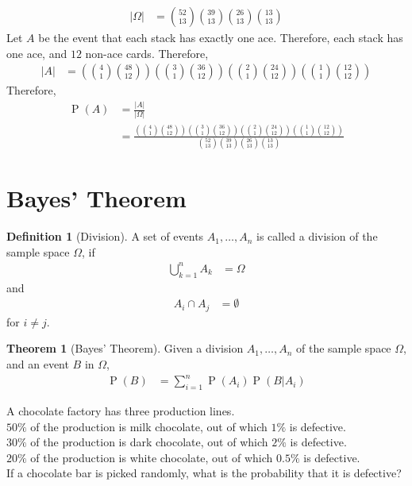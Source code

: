 \documentclass[titlepage, fleqn, a4paper, 12pt, twoside]{article}
\theoremstyle{definition}
\newtheorem{definition}{Definition}
\theoremstyle{theorem}
\newtheorem{theorem}{Theorem}
\DeclareMathOperator{\prob}{\mathrm{P}}
\begin{document}
\begin{solution}
	\begin{align*}
		|\Omega| & = \binom{52}{13} \binom{39}{13} \binom{26}{13} \binom{13}{13}
	\end{align*}
	Let $A$ be the event that each stack has exactly one ace.
	Therefore, each stack has one ace, and $12$ non-ace cards.
	Therefore,
	\begin{align*}
		|A| & = \left( \binom{4}{1} \binom{48}{12} \right) \left( \binom{3}{1} \binom{36}{12} \right) \left( \binom{2}{1} \binom{24}{12} \right) \left( \binom{1}{1} \binom{12}{12} \right)
	\end{align*}
	Therefore,
	\begin{align*}
		\prob(A) & = \frac{|A|}{|\Omega|} \\
                         & = \frac{\left( \binom{4}{1} \binom{48}{12} \right) \left( \binom{3}{1} \binom{36}{12} \right) \left( \binom{2}{1} \binom{24}{12} \right) \left( \binom{1}{1} \binom{12}{12} \right)}{\binom{52}{13} \binom{39}{13} \binom{26}{13} \binom{13}{13}}
	\end{align*}
\end{solution}

\section{Bayes' Theorem}

\begin{definition}[Division]
	A set of events $A_1,\dots,A_n$ is called a division of the sample space $\Omega$, if
	\begin{align*}
		\bigcup\limits_{k = 1}^{n} A_k & = \Omega
	\end{align*}
	and
	\begin{align*}
		A_i \cap A_j & = \emptyset
	\end{align*}
	for $i \neq j$.
\end{definition}

\begin{theorem}[Bayes' Theorem]
	Given a division $A_1,\dots,A_n$ of the sample space $\Omega$, and an event $B$ in $\Omega$,
	\begin{align*}
		\prob(B) & = \sum\limits_{i = 1}^{n} \prob(A_i) \prob(B|A_i)
	\end{align*}
	\label{thm:Bayes_Theorem}
\end{theorem}

\begin{question}
	A chocolate factory has three production lines.\\
	$50\%$ of the production is milk chocolate, out of which $1\%$ is defective.\\
	$30\%$ of the production is dark chocolate, out of which $2\%$ is defective.\\
	$20\%$ of the production is white chocolate, out of which $0.5\%$ is defective.\\
	If a chocolate bar is picked randomly, what is the probability that it is defective?
\end{question}
\end{document}
